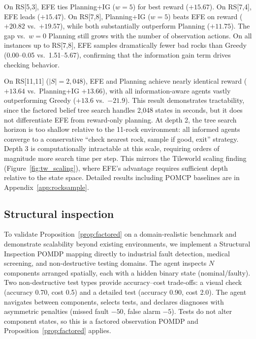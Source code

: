 \documentclass[runningheads]{llncs}
\begin{document}
On RS[5,3], EFE ties Planning+IG ($w{=}5$) for best reward ($+15.67$). On RS[7,4], EFE leads ($+15.47$). On RS[7,8], Planning+IG ($w{=}5$) beats EFE on reward ($+20.82$ vs.\ $+19.57$), while both substantially outperform Planning ($+11.75$). The gap vs.\ $w{=}0$ Planning still grows with the number of observation actions. On all instances up to RS[7,8], EFE samples dramatically fewer bad rocks than Greedy (0.00--0.05 vs.\ 1.51--5.67), confirming that the information gain term drives checking behavior.

On RS[11,11] ($|S|{=}2{,}048$), EFE and Planning achieve nearly identical reward ($+13.64$ vs.\ Planning+IG $+13.66$), with all information-aware agents vastly outperforming Greedy ($+13.6$ vs.\ $-21.9$). This result demonstrates tractability, since the factored belief tree search handles 2{,}048 states in seconds, but it does not differentiate EFE from reward-only planning. At depth 2, the tree search horizon is too shallow relative to the 11-rock environment: all informed agents converge to a conservative ``check nearest rock, sample if good, exit'' strategy. Depth 3 is computationally intractable at this scale, requiring orders of magnitude more search time per step. This mirrors the Tileworld scaling finding (Figure~\ref{fig:tw_scaling}), where EFE's advantage requires sufficient depth relative to the state space. Detailed results including POMCP baselines are in Appendix~\ref{app:rocksample}.

\subsection{Structural inspection}
\label{sec:inspection}

To validate Proposition~\ref{prop:factored} on a domain-realistic benchmark and demonstrate scalability beyond existing environments, we implement a Structural Inspection POMDP mapping directly to industrial fault detection, medical screening, and non-destructive testing domains. The agent inspects $N$ components arranged spatially, each with a hidden binary state (nominal/faulty). Two non-destructive test types provide accuracy--cost trade-offs: a visual check (accuracy 0.70, cost 0.5) and a detailed test (accuracy 0.90, cost 2.0). The agent navigates between components, selects tests, and declares diagnoses with asymmetric penalties (missed fault $-50$, false alarm $-5$). Tests do not alter component states, so this is a factored observation POMDP and Proposition~\ref{prop:factored} applies.
\end{document}

